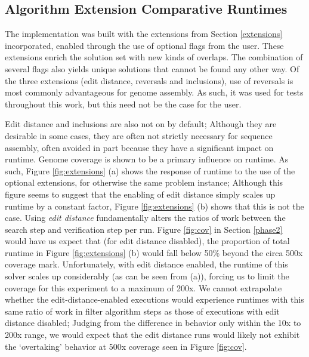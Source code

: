 \subsection{Algorithm Extension Comparative Runtimes}
\label{extension_runtimes}

The \aspop{} implementation was built with the extensions from Section \ref{extensions} incorporated, enabled through the use of optional flags from the user. These extensions enrich the \gls{solution} set with new kinds of overlaps. The combination of several flags also yields unique solutions that cannot be found any other way. Of the three extensions (\gls{edit distance}, \glspl{reversal} and \glspl{inclusion}), use of reversals is most commonly advantageous for genome assembly. As such, it was used for tests throughout this work, but this need not be the case for the user.

Edit distance and inclusions are also not on by default; Although they are desirable in some cases, they are often not strictly necessary for sequence assembly, often avoided in part because they have a significant impact on runtime. Genome \gls{coverage} is shown to be a primary influence on runtime. As such, Figure \ref{fig:extensions} (a) shows the response of runtime to the use of the optional extensions, for otherwise the same problem instance; Although this figure seems to suggest that the enabling of edit distance simply scales up runtime by a constant factor, Figure \ref{fig:extensions} (b) shows that this is not the case. Using \textit{edit distance} fundamentally alters the ratios of work between the \gls{search step} and \gls{verification step} per run. Figure \ref{fig:cov} in Section \ref{phase2} would have us expect that (for edit distance disabled), the proportion of total runtime in Figure \ref{fig:extensions} (b) would fall below 50\% beyond the circa 500x \gls{coverage} mark. Unfortunately, with edit distance enabled, the runtime of this solver scales up considerably (as can be seen from (a)), forcing us to limit the coverage for this experiment to a maximum of 200x. We cannot extrapolate whether the edit-distance-enabled executions would experience runtimes with this same ratio of work in \gls{filter algorithm} steps as those of executions with edit distance disabled; Judging from the difference in behavior only within the 10x to 200x range, we would expect that the edit distance runs would likely not exhibit the `overtaking' behavior at 500x coverage seen in Figure \ref{fig:cov}.

